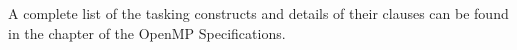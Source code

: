 A complete list of the tasking constructs and details of their clauses
can be found in the  chapter of the OpenMP Specifications.













